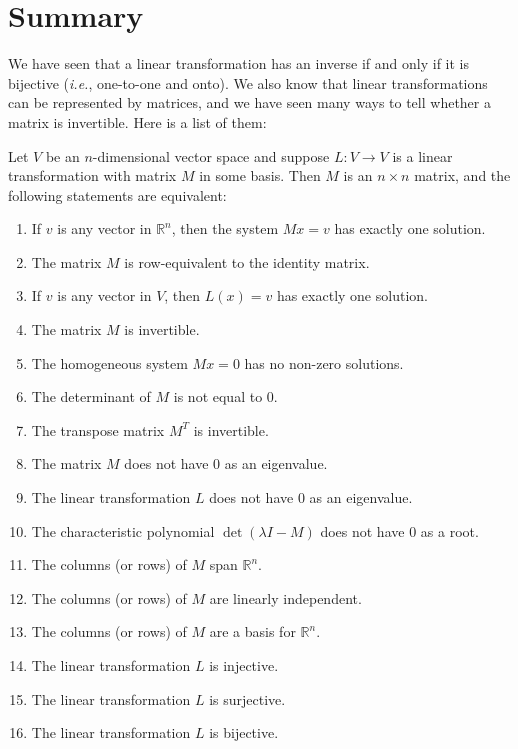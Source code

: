 \section{Summary}\label{thelist}
We have seen that a linear transformation has an inverse if and only if it is bijective ({\itshape i.e.}, one-to-one and onto). We also know that linear transformations can be represented by matrices, and we have seen many ways to tell whether a matrix is invertible. Here is a list of them:
\begin{theorem}[Invertibility]
\label{theorem:invertibility}
Let $V$  be an $n$-dimensional vector space  
and suppose  $L:V\to V$ is a linear transformation with matrix $M$ in some basis.
Then \(M\) is an \(n \times n\) matrix, and 
the following statements are equivalent:
\newpage
\begin{enumerate}
\item If $v$ is any vector in \(\mathbb{R}^n\), then the system \(Mx=v\) has exactly one solution.
\item The matrix \(M\) is row-equivalent to the identity matrix.
\item If \(v\) is any vector in \(V\), then \(L(x)=v\) has exactly one solution.
\item The matrix \(M\) is invertible.
\item The homogeneous system \(Mx=0\) has no non-zero solutions.
\item The determinant of \(M\) is not equal to \(0\).
\item The transpose matrix \(M^T\) is invertible.
\item The matrix \(M\) does not have \(0\) as an eigenvalue.
\item The linear transformation \(L\) does not have \(0\) as an eigenvalue.
\item The characteristic polynomial \(\det(\lambda I-M)\) does not have \(0\) as a root.
\item The columns (or rows) of \(M\) span \(\mathbb{R}^n\).
\item The columns (or rows) of \(M\) are linearly independent.
\item The columns (or rows) of \(M\) are a basis for \(\mathbb{R}^n\).
\item The linear transformation \(L\) is injective.
\item The linear transformation \(L\) is surjective.
\item The linear transformation \(L\) is bijective.
\end{enumerate}
\end{theorem}
